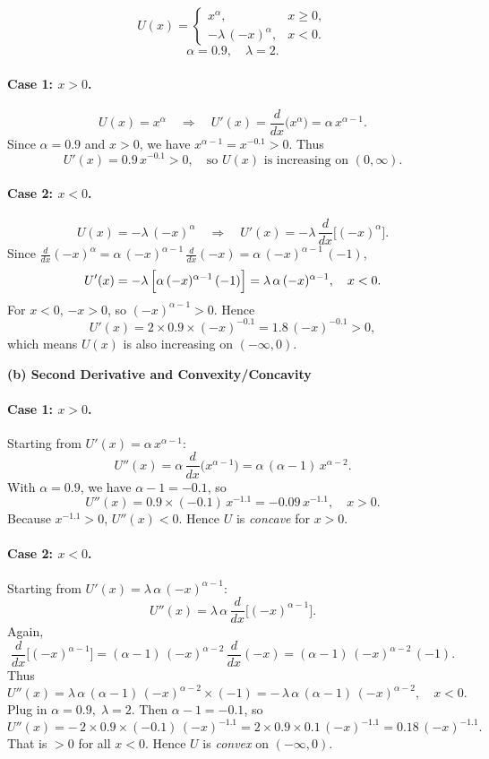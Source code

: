 \documentclass[12pt]{article}
\begin{document}
\[
U(x) = 
\begin{cases}
x^\alpha, & x \ge 0,\\
-\lambda\,(-x)^\alpha, & x < 0.
\end{cases}
\]
\[
\alpha = 0.9, \quad \lambda = 2.
\]

\paragraph{Case 1: \(x>0\).} 
\[
U(x) = x^\alpha 
\quad \Longrightarrow \quad
U'(x) = \frac{d}{dx}\bigl(x^\alpha\bigr) = \alpha\, x^{\alpha - 1}.
\]
Since \(\alpha = 0.9\) and \(x>0\), we have \(x^{\alpha-1} = x^{-0.1} > 0\). Thus
\[
U'(x) = 0.9\, x^{-0.1} > 0,\quad \text{so }U(x)\text{ is increasing on }(0,\infty).
\]

\paragraph{Case 2: \(x<0\).} 
\[
U(x) = -\lambda\,(-x)^\alpha
\quad \Longrightarrow \quad
U'(x) = -\lambda \,\frac{d}{dx}\bigl[(-x)^\alpha\bigr].
\]
Since \(\frac{d}{dx}(-x)^\alpha = \alpha\,(-x)^{\alpha-1}\, \frac{d}{dx}(-x) = \alpha\,(-x)^{\alpha-1} \,(-1)\),
\[
U'(x) 
= -\lambda \,\Bigl[\alpha\,(-x)^{\alpha-1}\,(-1)\Bigr]
= \lambda\,\alpha\,(-x)^{\alpha-1}, \quad x<0.
\]
For \(x<0\), \(-x>0\), so \((-x)^{\alpha-1} >0\). Hence
\[
U'(x) = 2 \times 0.9 \times (-x)^{-0.1} = 1.8\,(-x)^{-0.1} >0,
\]
which means \(U(x)\) is also increasing on \((-\infty,0)\).

\newpage

\noindent \textbf{(b) Second Derivative and Convexity/Concavity}

\paragraph{Case 1: \(x>0\).} 
Starting from \(U'(x) = \alpha\, x^{\alpha-1}\):
\[
U''(x) = \alpha \,\frac{d}{dx}\bigl(x^{\alpha - 1}\bigr) 
= \alpha\,(\alpha - 1)\,x^{\alpha - 2}.
\]
With \(\alpha=0.9\), we have \(\alpha - 1 = -0.1\), so
\[
U''(x) = 0.9 \times (-0.1)\, x^{-1.1}
= -0.09\, x^{-1.1}, \quad x>0.
\]
Because \(x^{-1.1}>0\), \(U''(x)<0\). Hence \(U\) is \emph{concave} for \(x>0\).

\paragraph{Case 2: \(x<0\).} 
Starting from \(U'(x) = \lambda \,\alpha\,(-x)^{\alpha - 1}\):
\[
U''(x) 
= \lambda\,\alpha \,\frac{d}{dx}\bigl[(-x)^{\alpha-1}\bigr].
\]
Again, 
\[
\frac{d}{dx}\bigl[(-x)^{\alpha-1}\bigr]
= (\alpha-1)\,(-x)^{\alpha-2}\,\frac{d}{dx}(-x) 
= (\alpha-1)\,(-x)^{\alpha-2}\,(-1).
\]
Thus
\[
U''(x) 
= \lambda\,\alpha\, (\alpha-1)\,(-x)^{\alpha-2} \times (-1)
= -\,\lambda\,\alpha\,(\alpha-1)\,(-x)^{\alpha-2}, \quad x<0.
\]
Plug in \(\alpha=0.9,\;\lambda=2\). Then \(\alpha-1=-0.1\), so
\[
U''(x) 
= -\,2 \times 0.9 \times (-0.1)\,(-x)^{-1.1}
= 2 \times 0.9 \times 0.1 \,(-x)^{-1.1}
= 0.18\,(-x)^{-1.1}.
\]
That is \(>0\) for all \(x<0\). Hence \(U\) is \emph{convex} on \((-\infty,0)\).
\end{document}
